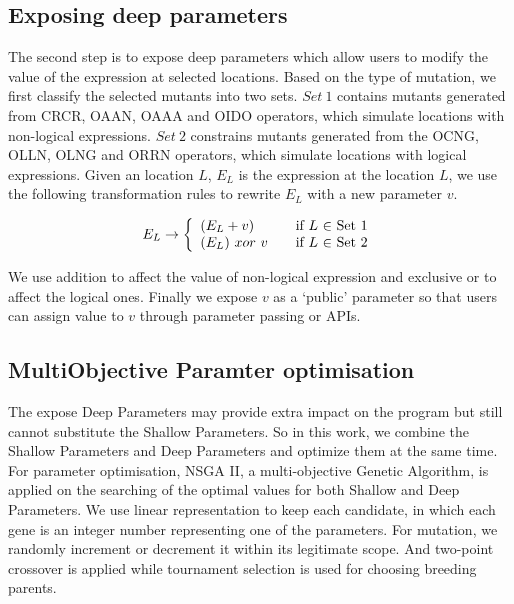 \subsection{Exposing deep parameters}
The second step is to expose deep parameters which allow users to modify the value of the expression at selected locations. Based on the type of mutation, we first classify the selected mutants into two sets. $Set\ 1$ contains mutants generated from CRCR, OAAN, OAAA and OIDO operators, which simulate locations with non-logical expressions. $Set\ 2$ constrains mutants generated from the OCNG, OLLN, OLNG and ORRN operators, which simulate locations with logical expressions. 
Given an location $L$, $E_L$ is the expression at the location $L$, we use the following transformation rules to rewrite $E_L$ with a new parameter $v$.

\begin{equation}
 E_L \rightarrow \left\{
  \begin{array}{l l}
    (E_L + v) & \quad \text{if $L$ $\in$ Set 1}\\
    (E_L) \ xor \ v & \quad \text{if $L$ $\in$ Set 2}
    \end{array} \right.
\end{equation}

We use addition to affect the value of non-logical expression and exclusive or to affect the logical ones.
Finally we expose $v$ as a `public' parameter so that users can assign value to $v$ through parameter passing or APIs.

\subsection{MultiObjective Paramter optimisation}
\label{sec_nsgaii}
The expose Deep Parameters may provide extra impact on the program but still cannot substitute the Shallow Parameters. So in this work, we combine the Shallow Parameters and Deep Parameters and optimize them at the same time. For parameter optimisation, NSGA II\cite{996017}, a multi-objective Genetic Algorithm, is applied on the searching of the optimal values for both Shallow and Deep Parameters.
We use linear representation to keep each candidate, in which each gene is an integer number representing one of the parameters. For mutation, we randomly increment or decrement it within its legitimate scope. And two-point crossover is applied while tournament selection is used for choosing breeding parents.

